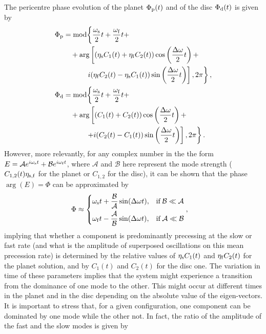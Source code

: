 \documentclass[usenatbib,a4paper,times,fleqn]{mnras}
\begin{document}
The pericentre phase evolution of the planet $\Phi_{\rm p}(t)$ and of the disc $\Phi_{\rm d}(t)$ is given by
\begin{align}
\Phi_{\rm p}  &={\rm mod}\bigg\{\frac{\omega_{\rm s}}{2}t+\frac{\omega_{\rm f}}{2}t+\nonumber\\
        &\quad+\arg\left[(\eta_{\rm s}C_1(t)+\eta_{\rm f}C_2(t))\cos\left(\frac{\Delta\omega}{2}t\right)+\right.\label{phasep}\\
        &\qquad\quad\left.\left.i(\eta_{\rm f}C_2(t)-\eta_{\rm s}C_1(t))\sin\left(\frac{\Delta\omega}{2}t\right)\right],2\pi\right\},\nonumber\\
\Phi_{\rm d}  &={\rm mod}\bigg\{ \frac{\omega_{\rm s}}{2}t+\frac{\omega_{\rm f}}{2}t+\nonumber\\
&\quad+\arg\left[(C_1(t)+C_2(t))\cos\left(\frac{\Delta\omega}{2}t\right)+\right.\label{phased}\\
&\qquad\quad\left.\left.+i(C_2(t)-C_1(t))\sin\left(\frac{\Delta\omega}{2}t\right)\right],2\pi\right\}.\nonumber
\end{align}
However, more relevantly, for any complex number in the the form $E=\mathcal{A}e^{i\omega_{\rm s} t}+\mathcal{B}e^{i\omega_{\rm f} t}$, where $\mathcal A$ and $\mathcal B$ here represent the mode strength ($C_{1,2}(t)\eta_{\rm s,f}$ for the planet or $C_{1,2}$ for the disc), it can be shown that the phase $\arg(E)=\Phi$ can be approximated by
\begin{align}
\Phi &\approx\begin{dcases}
          \omega_{\rm s}t+\frac{\mathcal{B}}{\mathcal{A}}\sin(\Delta\omega t),& {\rm if}\, \mathcal{B}\ll \mathcal{A}\\
         \omega_{\rm f}t-\frac{\mathcal{A}}{\mathcal{B}}\sin(\Delta\omega t),& {\rm if}\, \mathcal{A}\ll \mathcal{B}
         \end{dcases},\label{phit}
\end{align}
implying that whether a component is predominantly precessing at the slow or fast rate (and what is the amplitude of superposed oscillations on this mean precession rate) is determined by the relative values of $\eta_{\rm s}C_1(t)$ and $\eta_{\rm f}C_2(t)$ for the planet solution, and by $C_1(t)$ and $C_2(t)$ for the disc one. The variation in time of these parameters implies that the system might experience a transition from the dominance of one mode to the other. This might occur at different times in the planet and in the disc depending on the absolute value of the eigen-vectors. It is important to stress that, for a given configuration, one component can be dominated by one mode while the other not. In fact, the ratio of the amplitude of the fast and the slow modes is given by
\end{document}
